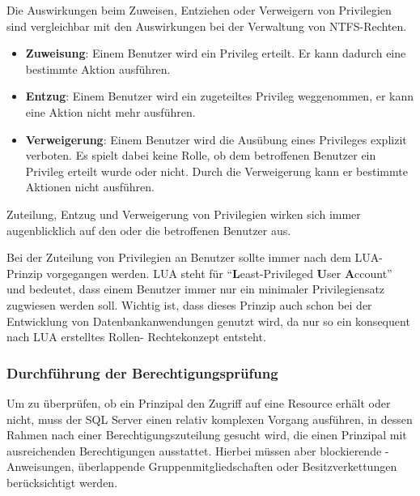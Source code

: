           Die Auswirkungen beim Zuweisen, Entziehen oder Verweigern von
          Privilegien sind vergleichbar mit den Auswirkungen bei der
          Verwaltung von NTFS-Rechten.
          \begin{itemize}
            \item \textbf{Zuweisung}: Einem Benutzer wird ein Privileg erteilt.
            Er kann dadurch eine bestimmte Aktion ausführen.
            \item \textbf{Entzug}: Einem Benutzer wird ein zugeteiltes Privileg
            weggenommen, er kann eine Aktion nicht mehr ausführen.
            \item \textbf{Verweigerung}: Einem Benutzer wird die Ausübung eines
            Privileges explizit verboten. Es spielt dabei keine Rolle, ob dem
            betroffenen Benutzer ein Privileg erteilt wurde oder nicht. Durch
            die Verweigerung kann er bestimmte Aktionen nicht ausführen.
          \end{itemize}
          \begin{merke}
            Zuteilung, Entzug und Verweigerung von Privilegien wirken sich immer
            augenblicklich auf den oder die betroffenen Benutzer aus.
          \end{merke}
          Bei der Zuteilung von Privilegien an Benutzer sollte immer nach dem
          LUA-Prinzip vorgegangen werden. LUA steht für
          \enquote{\textbf{L}east-Privileged \textbf{U}ser \textbf{A}ccount} und
          bedeutet, dass einem Benutzer immer nur ein minimaler Privilegiensatz
          zugwiesen werden soll. Wichtig ist, dass dieses Prinzip auch schon bei
          der Entwicklung von Datenbankanwendungen genutzt wird, da nur so ein
          konsequent nach LUA erstelltes Rollen- Rechtekonzept entsteht.
        \subsubsection{Durchführung der Berechtigungsprüfung}
          Um zu überprüfen, ob ein Prinzipal den Zugriff auf eine Resource
          erhält oder nicht, muss der SQL Server einen relativ komplexen Vorgang
          ausführen, in dessen Rahmen nach einer Berechtigungszuteilung gesucht
          wird, die einen Prinzipal mit ausreichenden Berechtigungen ausstattet.
          Hierbei müssen aber blockierende \DENY-Anweisungen, überlappende
          Gruppenmitgliedschaften oder Besitzverkettungen berücksichtigt werden.
          
